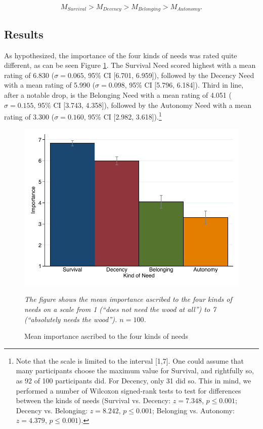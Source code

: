 \documentclass[egregdoesnotlikesansseriftitles]{scrartcl}
\begin{document}
\begin{equation}
   M_{Survival} > M_{Decency} > M_{Belonging} > M_{Autonomy}.
\end{equation}


\subsection{Results}
As hypothesized, the importance of the four kinds of needs was rated quite different, as can be seen Figure \ref{fig:study_1_bar}.
The Survival Need scored highest with a mean rating of 6.830 ($\sigma=0.065$, 95\% CI [6.701, 6.959]), followed by the Decency Need with a mean rating of 5.990 ($\sigma=0.098$, 95\% CI [5.796, 6.184]).
Third in line, after a notable drop, is the Belonging Need with a mean rating of 4.051 ($\sigma=0.155$, 95\% CI [3.743, 4.358]), followed by the Autonomy Need with a mean rating of 3.300 ($\sigma=0.160$, 95\% CI [2.982, 3.618]).\footnote{Note that the scale is limited to the interval [1,7]. One could assume that many participants choose the maximum value for Survival, and rightfully so, as 92 of 100 participants did. For Decency, only 31 did so. This in mind, we performed a number of Wilcoxon signed-rank tests to test for differences between the kinds of needs (Survival vs. Decency: $z = 7.348$, $p \leq 0.001$; Decency vs. Belonging: $z = 8.242$, $p \leq 0.001$; Belonging vs. Autonomy: $z = 4.379$, $p \leq 0.001$).}

\begin{figure}[t]
   \centering
   \includegraphics[width=.75\linewidth]{figures/figure_2.pdf}
   \begin{minipage}{0.75\linewidth}
   \footnotesize
   \emph{The figure shows the mean importance ascribed to the four kinds of needs on a scale from 1 (``does not need the wood at all'') to 7 (``absolutely needs the wood''). $n = 100$.}
   \end{minipage}
   \caption{Mean importance ascribed to the four kinds of needs}
   \label{fig:study_1_bar}
\end{figure}
\end{document}
